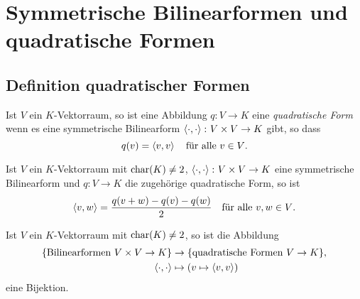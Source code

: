 \section{Symmetrische Bilinearformen und quadratische Formen}










\subsection{Definition quadratischer Formen}


\begin{definition}
  Ist $V$ ein $K$-Vektorraum, so ist eine Abbildung $q \colon V \to K$ eine \emph{quadratische Form} wenn es eine symmetrische Bilinearform $\left\langle \cdot, \cdot \right\rangle \colon V \times V \to K$ gibt, so dass
  \[
    q(v) = \left\langle v,v \right\rangle
    \quad
    \text{für alle $v \in V$}.
  \]
\end{definition}


\begin{lemma}[Polarisationsformel]
  Ist $V$ ein $K$-Vektorraum mit $\operatorname{char}(K) \neq 2$, $\left\langle \cdot, \cdot \right\rangle \colon V \times V \to K$ eine symmetrische Bilinearform und $q \colon V \to K$ die zugehörige quadratische Form, so ist
  \[
    \left\langle v, w \right\rangle = \frac{q(v+w)-q(v)-q(w)}{2}
    \quad
    \text{für alle $v, w \in V$}.
  \]
\end{lemma}


\begin{corollary}
  Ist $V$ ein $K$-Vektorraum mit $\operatorname{char}(K) \neq 2$, so ist die Abbildung
  \begin{align*}
    \{ \text{Bilinearformen $V \times V \to K$} \}
    &\to
    \{ \text{quadratische Formen $V \to K$} \},
    \\
    \left\langle \cdot, \cdot \right\rangle
    &\mapsto
    (v \mapsto \left\langle v,v \right\rangle)
  \end{align*}
  eine Bijektion.
\end{corollary}


